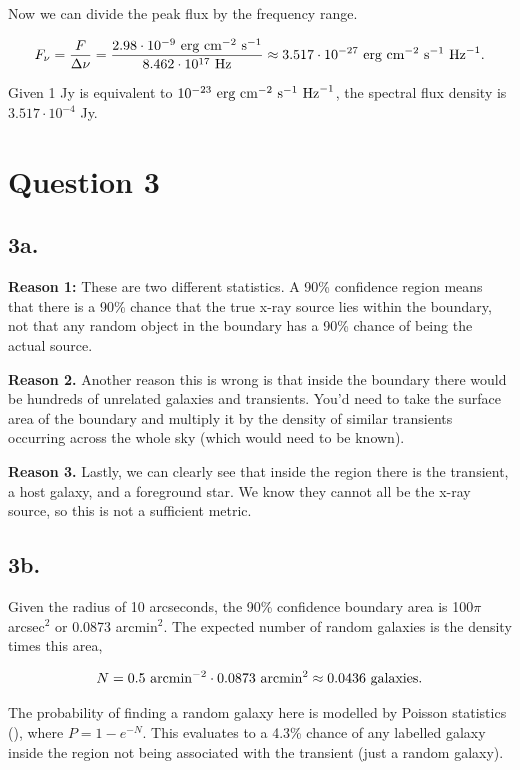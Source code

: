 \documentclass{article}
\begin{document}
Now we can divide the peak flux by the frequency range.

\begin{equation*}
    F_\nu=\frac{F}{\Delta\nu}=\frac{2.98\cdot10^{-9}\textup{ erg cm}^{-2}\textup{ s}^{-1}}{8.462\cdot10^{17}\textup{ Hz}}\approx3.517\cdot10^{-27}\textup{ erg cm}^{-2}\textup{ s}^{-1}\textup{ Hz}^{-1}.
\end{equation*}

Given 1 Jy is equivalent to $10^{-23}\textup{ erg cm}^{-2}\textup{ s}^{-1}\textup{ Hz}^{-1}$, the spectral flux density is $3.517\cdot10^{-4}$ Jy.

\section*{Question 3}

\subsection*{3a.}
\textbf{Reason 1:} These are two different statistics. A 90\% confidence region means that there is a 90\% chance that the true x-ray source lies within the boundary, not that any random object in the boundary has a 90\% chance of being the actual source.

\textbf{Reason 2.} Another reason this is wrong is that inside the boundary there would be hundreds of unrelated galaxies and transients. You'd need to take the surface area of the boundary and multiply it by the density of similar transients occurring across the whole sky (which would need to be known).

\textbf{Reason 3.} Lastly, we can clearly see that inside the region there is the transient, a host galaxy, and a foreground star. We know they cannot all be the x-ray source, so this is not a sufficient metric.

\subsection*{3b.}
Given the radius of 10 arcseconds, the 90\% confidence boundary area is 100$\pi$ arcsec$^2$ or 0.0873 arcmin$^2$. The expected number of random galaxies is the density times this area,

\begin{equation*}
    N=0.5\textup{ arcmin}^{-2}\cdot0.0873\textup{ arcmin}^2\approx0.0436\textup{ galaxies}.
\end{equation*}

The probability of finding a random galaxy here is modelled by Poisson statistics (\cite{Rieke}), where $P=1-e^{-N}$. This evaluates to a 4.3\% chance of any labelled galaxy inside the region not being associated with the transient (just a random galaxy).
\end{document}
